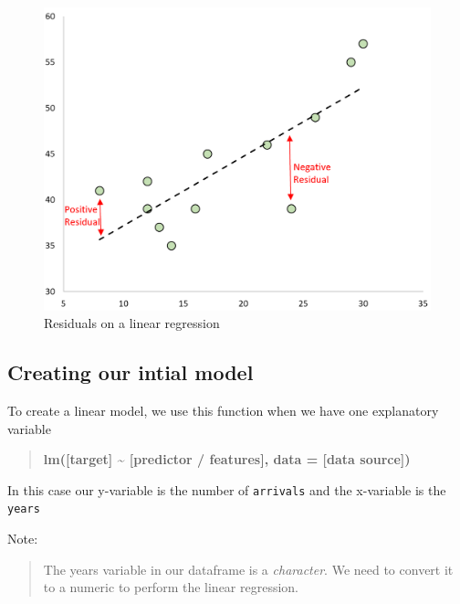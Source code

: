 \documentclass[
]{book}
\newenvironment{Shaded}{\begin{snugshade}}{\end{snugshade}}
\newcommand{\AttributeTok}[1]{\textcolor[rgb]{0.77,0.63,0.00}{#1}}
\newcommand{\FunctionTok}[1]{\textcolor[rgb]{0.00,0.00,0.00}{#1}}
\newcommand{\NormalTok}[1]{#1}
\newcommand{\OtherTok}[1]{\textcolor[rgb]{0.56,0.35,0.01}{#1}}
\newcommand{\SpecialCharTok}[1]{\textcolor[rgb]{0.00,0.00,0.00}{#1}}
\begin{document}
\begin{figure}
\includegraphics[width=15.5in]{images/residuals2} \caption{Residuals on a linear regression}\label{fig:unnamed-chunk-22}
\end{figure}

\hypertarget{creating-our-intial-model}{%
\subsection{Creating our intial model}\label{creating-our-intial-model}}

To create a linear model, we use this function when we have one explanatory variable

\begin{quote}
\textbf{lm({[}target{]} \textasciitilde{} {[}predictor / features{]}, data = {[}data source{]})}
\end{quote}

In this case our y-variable is the number of \texttt{arrivals} and the x-variable is the \texttt{years}

Note:

\begin{quote}
The years variable in our dataframe is a \emph{character}. We need to convert it to a numeric to perform the linear regression.
\end{quote}

\begin{Shaded}
\end{Shaded}
\end{document}
